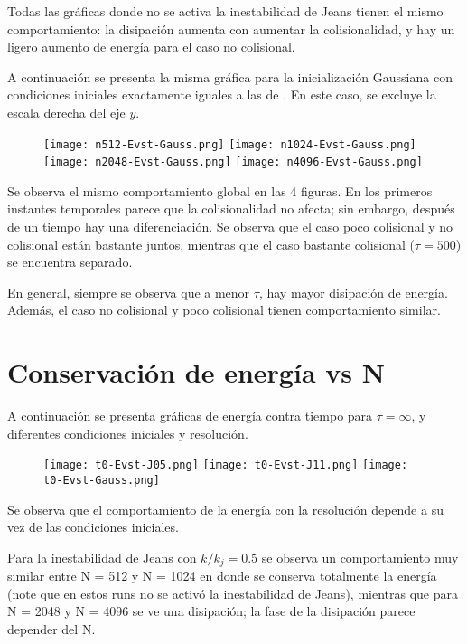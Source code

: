 \documentclass[notitlepage,letterpaper,12pt]{article} %
\begin{document}
Todas las gráficas donde no se activa la inestabilidad de Jeans tienen el mismo comportamiento: la disipación aumenta con aumentar la colisionalidad, y hay un ligero aumento de energía para el caso no colisional.
\newpage



A continuación se presenta la misma gráfica para la inicialización Gaussiana con condiciones iniciales exactamente iguales a las de \citet{integerLatticeDynamics}.
En este caso, se excluye la escala derecha del eje $y$.

\begin{figure}[h]
  \centering
   \texttt{[image: n512-Evst-Gauss.png]}
   \texttt{[image: n1024-Evst-Gauss.png]}
   \texttt{[image: n2048-Evst-Gauss.png]}
   \texttt{[image: n4096-Evst-Gauss.png]}
  \label{Evst para n}
\end{figure}

Se observa el mismo comportamiento global en las 4 figuras.
En los primeros instantes temporales parece que la colisionalidad no afecta; sin embargo, después de un tiempo hay una diferenciación.
Se observa que el caso poco colisional y no colisional están bastante juntos, mientras que el caso bastante colisional ($\tau = 500$) se encuentra separado.

En general, siempre se observa que a menor $\tau$, hay mayor disipación de energía. Además, el caso no colisional y poco colisional tienen comportamiento similar.


\section{Conservación de energía vs N}


A continuación se presenta gráficas de energía contra tiempo para $\tau = \infty$, y diferentes condiciones iniciales y resolución.


\begin{figure}[h]
  \centering
   \texttt{[image: t0-Evst-J05.png]}
   \texttt{[image: t0-Evst-J11.png]}
   \texttt{[image: t0-Evst-Gauss.png]}
  \label{Evst para n}
\end{figure}

\newpage

Se observa que el comportamiento de la energía con la resolución depende a su vez de las condiciones iniciales.

Para la inestabilidad de Jeans con $k/k_j = 0.5$ se observa un comportamiento muy similar entre N = 512 y N = 1024 en donde se conserva totalmente la energía (note que en estos runs no se activó la inestabilidad de Jeans), mientras que para N = 2048 y N = 4096 se ve una disipación; la fase de la disipación parece depender del N.
\end{document}
